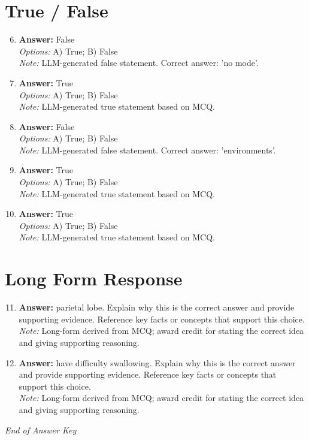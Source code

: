 \documentclass[12pt]{article}
\begin{document}
\section*{True / False}
\begin{enumerate}[label=\arabic*.]
\setcounter{enumi}{5}
\item \textbf{Answer:} False
\\ \textit{Options:} A) True; B) False
\\ \textit{Note:} LLM-generated false statement. Correct answer: 'no mode'.
\item \textbf{Answer:} True
\\ \textit{Options:} A) True; B) False
\\ \textit{Note:} LLM-generated true statement based on MCQ.
\item \textbf{Answer:} False
\\ \textit{Options:} A) True; B) False
\\ \textit{Note:} LLM-generated false statement. Correct answer: 'environments'.
\item \textbf{Answer:} True
\\ \textit{Options:} A) True; B) False
\\ \textit{Note:} LLM-generated true statement based on MCQ.
\item \textbf{Answer:} True
\\ \textit{Options:} A) True; B) False
\\ \textit{Note:} LLM-generated true statement based on MCQ.
\end{enumerate}

\section*{Long Form Response}
\begin{enumerate}[label=\arabic*.]
\setcounter{enumi}{10}
\item \textbf{Answer:} parietal lobe. Explain why this is the correct answer and provide supporting evidence. Reference key facts or concepts that support this choice.
\\ \textit{Note:} Long-form derived from MCQ; award credit for stating the correct idea and giving supporting reasoning.
\item \textbf{Answer:} have difficulty swallowing. Explain why this is the correct answer and provide supporting evidence. Reference key facts or concepts that support this choice.
\\ \textit{Note:} Long-form derived from MCQ; award credit for stating the correct idea and giving supporting reasoning.
\end{enumerate}

\vfill
\noindent\textit{End of Answer Key}
\end{document}

